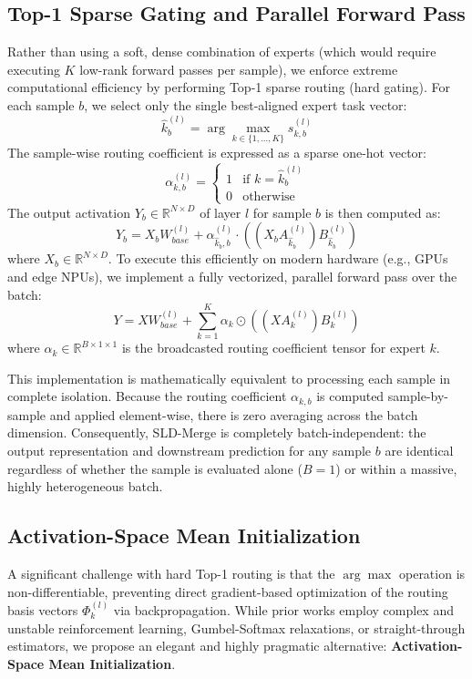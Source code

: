 \subsection{Top-1 Sparse Gating and Parallel Forward Pass}
Rather than using a soft, dense combination of experts (which would require executing $K$ low-rank forward passes per sample), we enforce extreme computational efficiency by performing Top-1 sparse routing (hard gating). For each sample $b$, we select only the single best-aligned expert task vector:
\begin{equation}
    \hat{k}_b^{(l)} = \arg\max_{k \in \{1, \dots, K\}} s_{k, b}^{(l)}
\end{equation}
The sample-wise routing coefficient is expressed as a sparse one-hot vector:
\begin{equation}
    \alpha_{k, b}^{(l)} = \begin{cases} 1 & \text{if } k = \hat{k}_b^{(l)} \\ 0 & \text{otherwise} \end{cases}
\end{equation}
The output activation $Y_b \in \mathbb{R}^{N \times D}$ of layer $l$ for sample $b$ is then computed as:
\begin{equation}
    Y_b = X_b W_{base}^{(l)} + \alpha_{\hat{k}_b, b}^{(l)} \cdot \left( (X_b A_{\hat{k}_b}^{(l)}) B_{\hat{k}_b}^{(l)} \right)
\end{equation}
where $X_b \in \mathbb{R}^{N \times D}$. To execute this efficiently on modern hardware (e.g., GPUs and edge NPUs), we implement a fully vectorized, parallel forward pass over the batch:
\begin{equation}
    Y = X W_{base}^{(l)} + \sum_{k=1}^K \alpha_k \odot \left( (X A_k^{(l)}) B_k^{(l)} \right)
\end{equation}
where $\alpha_k \in \mathbb{R}^{B \times 1 \times 1}$ is the broadcasted routing coefficient tensor for expert $k$. 

This implementation is mathematically equivalent to processing each sample in complete isolation. Because the routing coefficient $\alpha_{k,b}$ is computed sample-by-sample and applied element-wise, there is zero averaging across the batch dimension. Consequently, SLD-Merge is completely batch-independent: the output representation and downstream prediction for any sample $b$ are identical regardless of whether the sample is evaluated alone ($B=1$) or within a massive, highly heterogeneous batch.

\subsection{Activation-Space Mean Initialization}
A significant challenge with hard Top-1 routing is that the $\arg\max$ operation is non-differentiable, preventing direct gradient-based optimization of the routing basis vectors $\Phi_k^{(l)}$ via backpropagation. While prior works employ complex and unstable reinforcement learning, Gumbel-Softmax relaxations, or straight-through estimators, we propose an elegant and highly pragmatic alternative: \textbf{Activation-Space Mean Initialization}.

